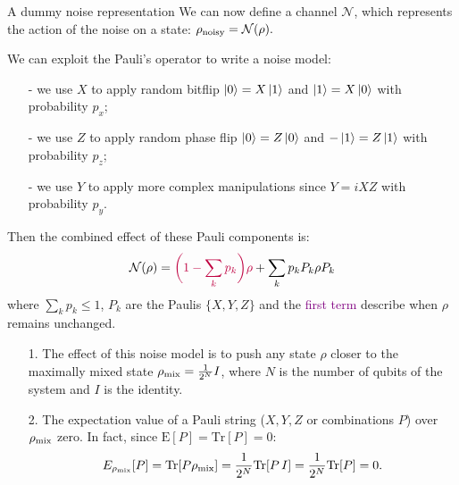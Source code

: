 \documentclass[aspectratio=169, 8pt, xcolor={svgnames}, hyperref={linkcolor=black}]{beamer}
\begin{document}
\begin{frame}{A dummy noise representation}
We can now define a channel $\mathcal{N}$, which represents the action of the 
noise on a state:
$ \rho_{\rm noisy} = \mathcal{N}(\rho). $ \pause

We can exploit the Pauli's operator to write a noise model:
\begin{itemize}[noitemsep]
\item[-] we use $X$ to apply random bitflip $\ket{0}=X\ket{1}$ and $\ket{1}=X\ket{0}$ with probability $p_x$;
\item[-] we use $Z$ to apply random phase flip $\ket{0}=Z\ket{0}$ and $-\ket{1}=Z\ket{1}$ with probability $p_z$;
\item[-] we use $Y$ to apply more complex manipulations since $Y=iXZ$ with probability $p_y$. \pause
\end{itemize}
Then the combined effect of these Pauli components is:
$$ \mathcal{N}(\rho) = \textcolor{purple}{\biggl(1 - \sum_{k}p_k\biggr) \rho} + \sum_k p_k P_k \rho P_k $$
where $\sum_k p_k \leq 1$, $P_k$ are the Paulis $\{X, Y, Z\}$
 and the \textcolor{purple}{first term} describe when $\rho$ remains unchanged. \pause

\vspace{0.2cm}
\begin{tcolorbox}[colback=red!15, title=Effect of the noise when computing expectation values]
\begin{itemize}[noitemsep]
\item[1.] The effect of this noise model is to push any state $\rho$ closer to the maximally mixed state $\rho_{\rm mix}=\frac{1}{2^N} I$, 
where $N$ is the number of qubits of the system and $I$ is the identity.
\item[2.] The expectation value of a Pauli string ($X, Y, Z$ or combinations $P$) over $\rho_{\rm mix}$ zero. In fact, since
$\text{E}[P] = \text{Tr}[P]=0$:
$$E_{\rho_{\rm mix}}[P]=\text{Tr}[P\rho_{\rm mix}]=\frac{1}{2^N}\text{Tr}[P\,I] = \frac{1}{2^N}\text{Tr}[P] = 0.$$
\end{itemize}
\end{tcolorbox}
\end{frame}
\end{document}
